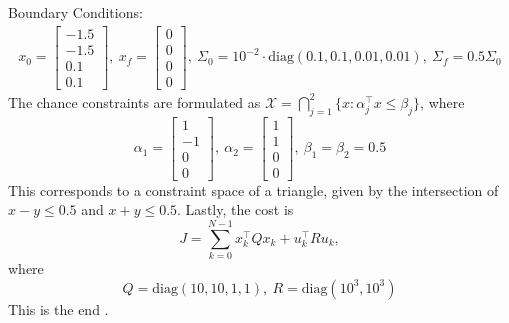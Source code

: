 \documentclass[12pt]{article}
\begin{document}
Boundary Conditions:
\begin{align*}
x_0 = 
\begin{bmatrix}
-1.5\\
-1.5\\
0.1\\
0.1
\end{bmatrix},\
x_f = 
\begin{bmatrix}
0\\
0\\
0\\
0
\end{bmatrix},\
\Sigma_0 = 10^{-2}\cdot\text{diag}(0.1,0.1,0.01,0.01),\ \Sigma_f = 0.5\Sigma_0
\end{align*}
The chance constraints are formulated as $\mathcal{X} = \bigcap_{j=1}^{2}\{x:\alpha_j^\intercal x \leq \beta_j\}$, where 
\begin{equation*}
\alpha_1 = 
\begin{bmatrix}
1\\
-1\\
0\\
0
\end{bmatrix},\
\alpha_2 = 
\begin{bmatrix}
1\\
1\\
0\\
0
\end{bmatrix},\
\beta_1 = \beta_2 = 0.5
\end{equation*}
This corresponds to a constraint space of a triangle, given by the intersection of $x - y \leq 0.5$ and $x + y \leq 0.5$. Lastly, the cost is 
\begin{equation*}
J = \sum_{k=0}^{N-1} x_k^\intercal Q x_k + u_k^\intercal R u_k,
\end{equation*}
where 
\begin{equation*}
Q = \text{diag}(10,10,1,1),\ R = \text{diag}(10^3,10^3)
\end{equation*}
This is the end \cite{b1}.

 

\end{document}
